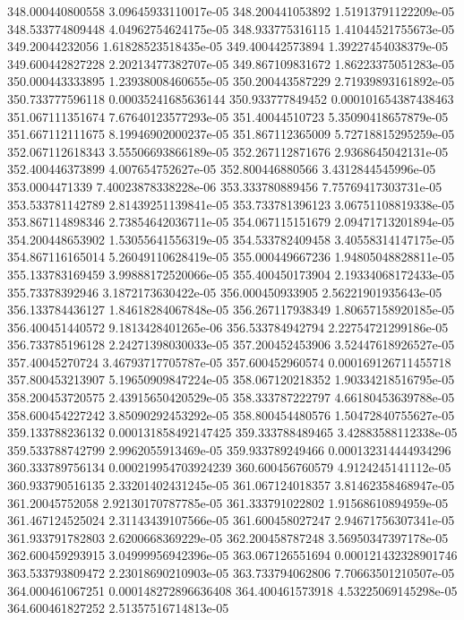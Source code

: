 {348.000440800558 3.09645933110017e-05
348.200441053892 1.51913791122209e-05
348.533774809448 4.04962754624175e-05
348.933775316115 1.41044521755673e-05
349.20044232056 1.61828523518435e-05
349.400442573894 1.39227454038379e-05
349.600442827228 2.20213477382707e-05
349.867109831672 1.86223375051283e-05
350.000443333895 1.23938008460655e-05
350.200443587229 2.71939893161892e-05
350.733777596118 0.00035241685636144
350.933777849452 0.000101654387438463
351.067111351674 7.67640123577293e-05
351.40044510723 5.35090418657879e-05
351.667112111675 8.19946902000237e-05
351.867112365009 5.72718815295259e-05
352.067112618343 3.55506693866189e-05
352.267112871676 2.9368645042131e-05
352.400446373899 4.007654752627e-05
352.800446880566 3.4312844545996e-05
353.0004471339 7.40023878338228e-06
353.333780889456 7.75769417303731e-05
353.533781142789 2.81439251139841e-05
353.733781396123 3.06751108819338e-05
353.867114898346 2.73854642036711e-05
354.067115151679 2.09471713201894e-05
354.200448653902 1.53055641556319e-05
354.533782409458 3.40558314147175e-05
354.867116165014 5.26049110628419e-05
355.000449667236 1.94805048828811e-05
355.133783169459 3.99888172520066e-05
355.400450173904 2.19334068172433e-05
355.73378392946 3.1872173630422e-05
356.000450933905 2.56221901935643e-05
356.133784436127 1.84618284067848e-05
356.267117938349 1.80657158920185e-05
356.400451440572 9.1813428401265e-06
356.533784942794 2.22754721299186e-05
356.733785196128 2.24271398030033e-05
357.200452453906 3.52447618926527e-05
357.40045270724 3.46793717705787e-05
357.600452960574 0.000169126711455718
357.800453213907 5.19650909847224e-05
358.067120218352 1.90334218516795e-05
358.200453720575 2.43915650420529e-05
358.333787222797 4.66180453639788e-05
358.600454227242 3.85090292453292e-05
358.800454480576 1.50472840755627e-05
359.133788236132 0.000131858492147425
359.333788489465 3.42883588112338e-05
359.533788742799 2.9962055913469e-05
359.933789249466 0.000132314444934296
360.333789756134 0.000219954703924239
360.600456760579 4.9124245141112e-05
360.933790516135 2.33201402431245e-05
361.067124018357 3.81462358468947e-05
361.20045752058 2.92130170787785e-05
361.333791022802 1.91568610894959e-05
361.467124525024 2.31143439107566e-05
361.600458027247 2.94671756307341e-05
361.933791782803 2.6200668369229e-05
362.200458787248 3.56950347397178e-05
362.600459293915 3.04999956942396e-05
363.067126551694 0.000121432328901746
363.533793809472 2.23018690210903e-05
363.733794062806 7.70663501210507e-05
364.000461067251 0.000148272896636408
364.400461573918 4.53225069145298e-05
364.600461827252 2.51357516714813e-05
}
